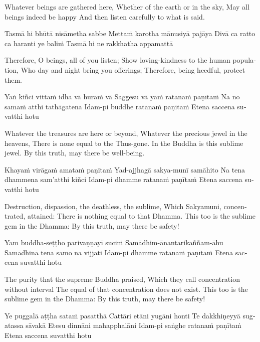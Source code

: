 \begin{english}
\begin{english}
\begin{english}
Whatever beings are gathered here,
Whether of the earth or in the sky,
May all beings indeed be happy
And then listen carefully to what is said.
\end{english}

Tasmā hi bhūtā nisāmetha sabbe
Mettaṁ karotha mānusiyā pajāya
Divā ca ratto ca haranti ye baliṁ
Tasmā hi ne rakkhatha appamattā

\begin{english}
Therefore, O beings, all of you listen;
Show loving-kindness to the human population,
Who day and night bring you offerings;
Therefore, being heedful, protect them.
\end{english}

Yaṅ kiñci vittaṁ idha vā huraṁ vā
Saggesu vā yaṁ ratanaṁ paṇītaṁ
Na no samaṁ atthi tathāgatena
Idam-pi buddhe ratanaṁ paṇītaṁ
Etena saccena suvatthi hotu

\begin{english}
Whatever the treasures are here or beyond,
Whatever the precious jewel in the heavens,
There is none equal to the Thus-gone.
In the Buddha is this sublime jewel.
By this truth, may there be well-being.
\end{english}

Khayaṁ virāgaṁ amataṁ paṇītaṁ
Yad-ajjhagā sakya-munī samāhito
Na tena dhammena sam’atthi kiñci
Idam-pi dhamme ratanaṁ paṇītaṁ
Etena saccena suvatthi hotu

\begin{english}
Destruction, dispassion, the deathless, the sublime,
Which Sakyamuni, concentrated, attained:
There is nothing equal to that Dhamma.
This too is the sublime gem in the Dhamma:
By this truth, may there be safety!
\end{english}

Yam buddha-seṭṭho parivaṇṇayī suciṁ
Samādhim-ānantarikaññam-āhu
Samādhinā tena samo na vijjati
Idam-pi dhamme ratanaṁ paṇītaṁ
Etena saccena suvatthi hotu

\begin{english}
The purity that the supreme Buddha praised,
Which they call concentration without interval
The equal of that concentration does not exist.
This too is the sublime gem in the Dhamma:
By this truth, may there be safety!
\end{english}

Ye puggalā aṭṭha sataṁ pasatthā
Cattāri etāni yugāni honti
Te dakkhiṇeyyā sugatassa sāvakā
Etesu dinnāni mahapphalāni
Idam-pi saṅghe ratanaṁ paṇītaṁ
Etena saccena suvatthi hotu


\end{english}
\end{english}
